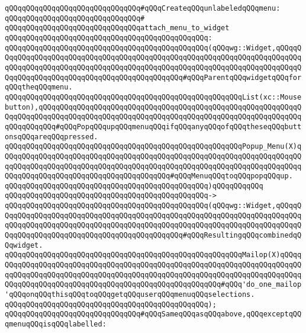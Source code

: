 \verb|qQQqqQQqqQQqqQQqqQQqqQQqqQQqqQQq#qQQqCreateqQQqunlabeledqQQqmenu:|\newline
\verb|qQQqqQQqqQQqqQQqqQQqqQQqqQQqqQQq#|\newline
\verb|qQQqqQQqqQQqqQQqqQQqqQQqqQQqqQQqattach_menu_to_widget|\newline
\verb|qQQqqQQqqQQqqQQqqQQqqQQqqQQqqQQqqQQqqQQqqQQqqQQq:|\newline
\verb|qQQqqQQqqQQqqQQqqQQqqQQqqQQqqQQqqQQqqQQqqQQqqQQq(qQQqwg::Widget,qQQqqQQqqQQqqQQqqQQqqQQqqQQqqQQqqQQqqQQqqQQqqQQqqQQqqQQqqQQqqQQqqQQqqQQqqQQqqQQqqQQqqQQqqQQqqQQqqQQqqQQqqQQqqQQqqQQqqQQqqQQqqQQqqQQqqQQqqQQqqQQqqQQqqQQqqQQqqQQqqQQqqQQqqQQqqQQqqQQqqQQqqQQq#qQQqParentqQQqwidgetqQQqforqQQqtheqQQqmenu.|\newline
\verb|qQQqqQQqqQQqqQQqqQQqqQQqqQQqqQQqqQQqqQQqqQQqqQQqqQQqqQQqList(xc::Mousebutton),qQQqqQQqqQQqqQQqqQQqqQQqqQQqqQQqqQQqqQQqqQQqqQQqqQQqqQQqqQQqqQQqqQQqqQQqqQQqqQQqqQQqqQQqqQQqqQQqqQQqqQQqqQQqqQQqqQQqqQQqqQQqqQQqqQQqqQQqqQQqqQQq#qQQqPopqQQqupqQQqmenuqQQqifqQQqanyqQQqofqQQqtheseqQQqbuttonsqQQqareqQQqpressed.|\newline
\verb|qQQqqQQqqQQqqQQqqQQqqQQqqQQqqQQqqQQqqQQqqQQqqQQqqQQqqQQqPopup_Menu(X)qQQqqQQqqQQqqQQqqQQqqQQqqQQqqQQqqQQqqQQqqQQqqQQqqQQqqQQqqQQqqQQqqQQqqQQqqQQqqQQqqQQqqQQqqQQqqQQqqQQqqQQqqQQqqQQqqQQqqQQqqQQqqQQqqQQqqQQqqQQqqQQqqQQqqQQqqQQqqQQqqQQqqQQqqQQqqQQqqQQq#qQQqMenuqQQqtoqQQqpopqQQqup.|\newline
\verb|qQQqqQQqqQQqqQQqqQQqqQQqqQQqqQQqqQQqqQQqqQQqqQQq)qQQqqQQqqQQq|\newline
\verb|qQQqqQQqqQQqqQQqqQQqqQQqqQQqqQQqqQQqqQQqqQQqqQQq->|\newline
\verb|qQQqqQQqqQQqqQQqqQQqqQQqqQQqqQQqqQQqqQQqqQQqqQQq(qQQqwg::Widget,qQQqqQQqqQQqqQQqqQQqqQQqqQQqqQQqqQQqqQQqqQQqqQQqqQQqqQQqqQQqqQQqqQQqqQQqqQQqqQQqqQQqqQQqqQQqqQQqqQQqqQQqqQQqqQQqqQQqqQQqqQQqqQQqqQQqqQQqqQQqqQQqqQQqqQQqqQQqqQQqqQQqqQQqqQQqqQQqqQQqqQQqqQQq#qQQqResultingqQQqcombinedqQQqwidget.|\newline
\verb|qQQqqQQqqQQqqQQqqQQqqQQqqQQqqQQqqQQqqQQqqQQqqQQqqQQqqQQqMailop(X)qQQqqQQqqQQqqQQqqQQqqQQqqQQqqQQqqQQqqQQqqQQqqQQqqQQqqQQqqQQqqQQqqQQqqQQqqQQqqQQqqQQqqQQqqQQqqQQqqQQqqQQqqQQqqQQqqQQqqQQqqQQqqQQqqQQqqQQqqQQqqQQqqQQqqQQqqQQqqQQqqQQqqQQqqQQqqQQqqQQqqQQqqQQqqQQqqQQq#qQQq'do_one_mailop'qQQqonqQQqthisqQQqtoqQQqgetqQQquserqQQqmenuqQQqselections.|\newline
\verb|qQQqqQQqqQQqqQQqqQQqqQQqqQQqqQQqqQQqqQQqqQQqqQQq);|\newline
\newline
\verb|qQQqqQQqqQQqqQQqqQQqqQQqqQQqqQQq#qQQqSameqQQqasqQQqabove,qQQqexceptqQQqmenuqQQqisqQQqlabelled:|\newline
